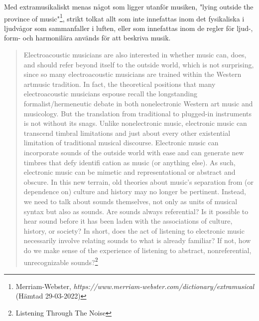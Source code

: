 \documentclass{article}
\begin{document}
Med extramusikaliskt menas något som ligger utanför musiken, "lying outside the province of
music"\footnote{Merriam-Webster, \emph{https://www.merriam-webster.com/dictionary/extramusical} (Hämtad
29-03-2022)}, strikt tolkat allt som inte innefattas inom det fysikaliska i ljudvågor som sammanfaller i
luften, eller som innefattas inom de regler för ljud-, form- och harmonilära används för att beskriva musik. 


\begin{quote}
		Electroacoustic musicians are also interested in whether music can, does, and should refer beyond
		itself to the outside world, which is not surprising, since so many electroacoustic musicians are
		trained within the Western artmusic tradition. In fact, the theoretical positions that many
		electroacoustic musicians espouse recall the longstanding formalist/hermeneutic debate in both
		nonelectronic Western art music and musicology. But the translation from traditional to plugged-in
		instruments is not without its snags. Unlike nonelectronic music, electronic music can transcend
		timbral limitations and just about every other existential limitation of traditional musical
		discourse. Electronic music can incorporate sounds of the outside world with ease and can generate new
		timbres that defy identifi cation as music (or anything else). As such, electronic music can be
		mimetic and representational or abstract and obscure. In this new terrain, old theories about music’s
		separation from (or dependence on) culture and history may no longer be pertinent. Instead, we need to
		talk about sounds themselves, not only as units of musical syntax but also as sounds. Are sounds
		always referential? Is it possible to hear sound before it has been laden with the associations of
		culture, history, or society? In short, does the act of listening to electronic music
		necessarily involve relating sounds to what is already familiar? If not, how do we make sense of the
		experience of listening to abstract, nonreferential, unrecognizable sounds?\footnote{Listening Through The Noise}
\end{quote}
\end{document}
